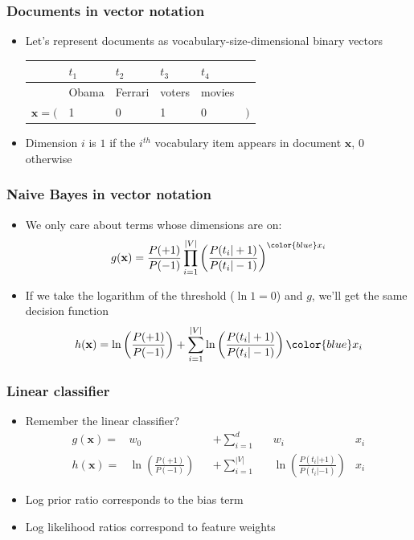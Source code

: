 \documentclass[14pt,mathserif]{beamer}
\newcommand{\x}{\mathbf{x}}
\begin{document}
\begin{frame}
  \frametitle{Documents in vector notation}
  \begin{itemize}
  \item Let's represent documents as vocabulary-size-dimensional
    binary vectors 

    \begin{tabular}{rlllll}
          &    $t_1$& $t_2$   & $t_3$   & $t_4$   & \\\hline
          & Obama   & Ferrari & voters  & movies & \\\hline
$\x = ($   & 1       & 0       & 1       & 0 & $)$\\
    \end{tabular}
  \item Dimension $i$ is $1$ if the $i^{th}$ vocabulary item appears in
    document $\x$, $0$ otherwise
  \end{itemize}
\end{frame}

\begin{frame}
  \frametitle{Naive Bayes in vector notation}
  \begin{itemize}
  \item 
    We only care about terms whose dimensions are on:
    \[
      g(\x) = \frac{P(+1)}{P(-1)} \prod_{i=1}^{|V|} \left(\frac{P(t_i|+1)}{P(t_i|-1)}\right)^{\color{blue} x_i}
    \]
  \item If we take the logarithm of the threshold ($\ln 1 = 0$) and
    $g$, we'll get the same decision function
    \begin{align}
      h(\x) = \ln\left(\frac{P(+1)}{P(-1)}\right) + \sum_{i=1}^{|V|} \ln\left(\frac{P(t_i|+1)}{P(t_i|-1)}\right)\color{blue}x_i
    \end{align}
  \end{itemize}
\end{frame}

\begin{frame}
  \frametitle{Linear classifier}
  \begin{itemize}
  \item Remember the linear classifier?
    \begin{align}\nonumber
      g(\x) = & w_0               &  & + \sum_{i=1}^d      && w_i 
                            & x_i \\\nonumber
      h(\x) = &  \ln\left(\frac{P(+1)}{P(-1)}\right)      &  & + \sum_{i=1}^{|V|}  &&  \ln\left(\frac{P(t_i|+1)}{P(t_i|-1)}\right)
                            & x_i 
    \end{align} 
  \item Log prior ratio corresponds to the bias term
  \item Log likelihood ratios correspond to feature weights
  \end{itemize}
\end{frame}
\end{document}
